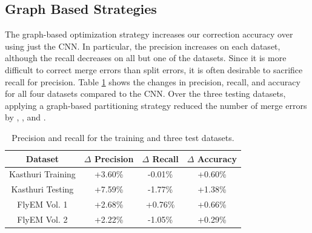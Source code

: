 \subsection{Graph Based Strategies}

The graph-based optimization strategy increases our correction accuracy over using just the CNN. 
In particular, the precision increases on each dataset, although the recall decreases on all but one of the datasets. 
Since it is more difficult to correct merge errors than split errors, it is often desirable to sacrifice recall for precision. 
Table \ref{table:multicut} shows the changes in precision, recall, and accuracy for all four datasets compared to the CNN. 
Over the three testing datasets, applying a graph-based partitioning strategy reduced the number of merge errors by , , and . 

\begin{table}[h]
	\centering
	\begin{tabular}{c c c c} \hline
		\textbf{Dataset} & $\Delta$ \textbf{Precision} & $\Delta$ \textbf{Recall} & $\Delta$ \textbf{Accuracy} \\ \hline
		Kasthuri Training & +3.60\% & -0.01\% & +0.60\% \\
		Kasthuri Testing & +7.59\% & -1.77\% & +1.38\% \\
		FlyEM Vol. 1 & +2.68\% & +0.76\% & +0.66\% \\
		FlyEM Vol. 2 & +2.22\% & -1.05\% & +0.29\% \\ \hline
	\end{tabular}
	\caption{Precision and recall for the training and three test datasets.}
	\label{table:multicut}
\end{table}
